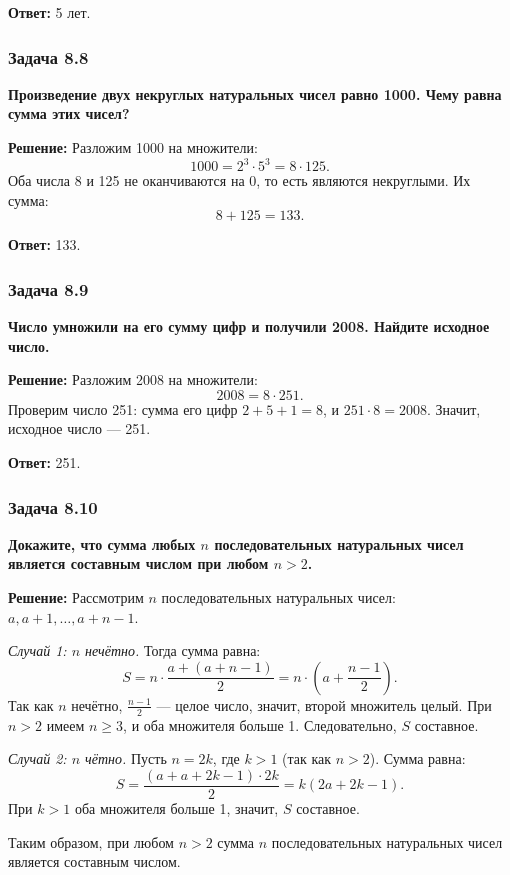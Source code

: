 \documentclass[12pt, a4paper]{article}
\begin{document}
\textbf{Ответ:} 5 лет.

\subsubsection*{Задача 8.8}
\textbf{Произведение двух некруглых натуральных чисел равно 1000. Чему равна сумма этих чисел?}

\textbf{Решение:}
Разложим 1000 на множители:
\[
1000 = 2^3 \cdot 5^3 = 8 \cdot 125.
\]
Оба числа 8 и 125 не оканчиваются на 0, то есть являются некруглыми. Их сумма:
\[
8 + 125 = 133.
\]

\textbf{Ответ:} 133.

\subsubsection*{Задача 8.9}
\textbf{Число умножили на его сумму цифр и получили 2008. Найдите исходное число.}

\textbf{Решение:}
Разложим 2008 на множители:
\[
2008 = 8 \cdot 251.
\]
Проверим число 251: сумма его цифр $2 + 5 + 1 = 8$, и $251 \cdot 8 = 2008$. Значит, исходное число — 251.

\textbf{Ответ:} 251.

\subsubsection*{Задача 8.10}
\textbf{Докажите, что сумма любых $n$ последовательных натуральных чисел является составным числом при любом $n > 2$.}

\textbf{Решение:}
Рассмотрим $n$ последовательных натуральных чисел: $a, a+1, \ldots, a+n-1$.

\textit{Случай 1: $n$ нечётно.} Тогда сумма равна:
\[
S = n \cdot \frac{a + (a+n-1)}{2} = n \cdot \left(a + \frac{n-1}{2}\right).
\]
Так как $n$ нечётно, $\frac{n-1}{2}$ — целое число, значит, второй множитель целый. При $n > 2$ имеем $n \ge 3$, и оба множителя больше 1. Следовательно, $S$ составное.

\textit{Случай 2: $n$ чётно.} Пусть $n = 2k$, где $k > 1$ (так как $n > 2$). Сумма равна:
\[
S = \frac{(a + a + 2k - 1) \cdot 2k}{2} = k(2a + 2k - 1).
\]
При $k > 1$ оба множителя больше 1, значит, $S$ составное.

Таким образом, при любом $n > 2$ сумма $n$ последовательных натуральных чисел является составным числом.
\end{document}
